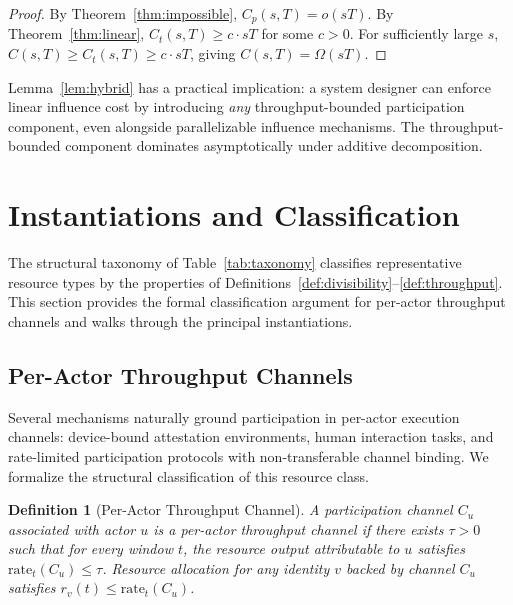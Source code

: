 \documentclass[10pt,journal,compsoc]{IEEEtran}
\newtheorem{definition}[theorem]{Definition}
\theoremstyle{remark}
\begin{document}
	\begin{proof}
		By Theorem~\ref{thm:impossible},
		$C_p(s,T) = o(sT)$.
		By Theorem~\ref{thm:linear},
		$C_t(s,T) \geq c \cdot sT$ for some $c > 0$.
		For sufficiently large $s$,
		$C(s,T) \geq C_t(s,T) \geq c \cdot sT$,
		giving $C(s,T) = \Omega(sT)$.
	\end{proof}
	
	Lemma~\ref{lem:hybrid} has a practical implication:
	a system designer can enforce linear influence cost
	by introducing \emph{any} throughput-bounded
	participation component, even alongside parallelizable
	influence mechanisms.
	The throughput-bounded component dominates
	asymptotically under additive decomposition.
	
	\section{Instantiations and Classification}
	\label{sec:instantiations}
	
	The structural taxonomy of Table~\ref{tab:taxonomy}
	classifies representative resource types by the
	properties of Definitions~\ref{def:divisibility}--\ref{def:throughput}.
	This section provides the formal classification
	argument for per-actor throughput channels and
	walks through the principal instantiations.
	
	\subsection{Per-Actor Throughput Channels}
	\label{ssec:channels}
	
	Several mechanisms naturally ground participation
	in per-actor execution channels: device-bound
	attestation environments, human interaction tasks,
	and rate-limited participation protocols with
	non-transferable channel binding.
	We formalize the structural classification of this
	resource class.
	
	\begin{definition}[Per-Actor Throughput Channel]
		\label{def:channel}
		A participation channel $C_u$ associated with actor
		$u$ is a \emph{per-actor throughput channel} if
		there exists $\tau > 0$ such that for every window $t$,
		the resource output attributable to $u$ satisfies
		$\mathrm{rate}_t(C_u) \leq \tau$.
		Resource allocation for any identity $v$ backed by
		channel $C_u$ satisfies $r_v(t) \leq \mathrm{rate}_t(C_u)$.
	\end{definition}
	
\end{document}
